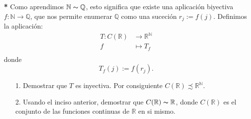 \documentclass{book}
\newcommand{\rr}{\mathbb{R}}
\newcommand{\nn}{\mathbb{N}}
\begin{document}
\begin{ejer}{}\textbf{*}  Como aprendimos $\nn\thicksim\mathbb{Q}$, esto
significa que existe una aplicación biyectiva
$f:\nn\longrightarrow\mathbb{Q}$, que nos permite enumerar
$\mathbb{Q}$ como una suceción $r_j:=f(j)$. Definimos la
aplicación:
\[\begin{split}
              T:C(\rr)&\longrightarrow \rr^{\nn}\\
              f        &\longmapsto T_f\\
\end{split}\]
donde
\[
  T_f(j):=f(r_j).
\]
\begin{itemize}
   \item [1.] Demostrar que $T$ es inyectiva. Por consiguiente
   $C(\rr)\precsim\rr^{\nn}$.
   \item[2.] Usando el inciso anterior, demostrar que
    $C(\rr)\thicksim\rr$, donde $C(\rr)$ es el conjunto
    de las funciones continuas de $\rr$ en si mismo.
\end{itemize}
\end{ejer}
\end{document}

